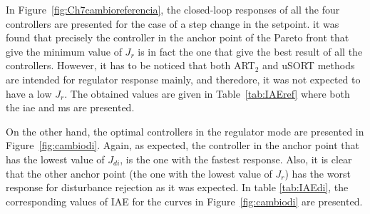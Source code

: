 In Figure~\ref{fig:Ch7cambioreferencia}, the closed-loop responses of all the four controllers are presented for the case of a step change in the setpoint. it was found that precisely the controller in the anchor point of the Pareto front that give the minimum value of $J_r$ is in fact the one that give the best result of all the controllers. However, it has to be noticed that both ART$_2$ and uSORT methods are intended for regulator response mainly, and theredore, it was not expected to have a low $J_r$. The obtained values are given in Table~\ref{tab:IAEref} where both the \gls{iae} and \gls{ms} are presented. 

On the other hand, the optimal controllers in the regulator mode are presented in Figure~\ref{fig:cambiodi}. Again, as expected, the controller in the anchor point that has the lowest value of $J_{di}$, is the one with the fastest response. Also, it is clear that the other anchor point (the one with the lowest value of $J_r$) has the worst response for disturbance rejection as it was expected. In table \ref{tab:IAEdi}, the corresponding values of IAE for the curves in Figure~\ref{fig:cambiodi} are presented.

